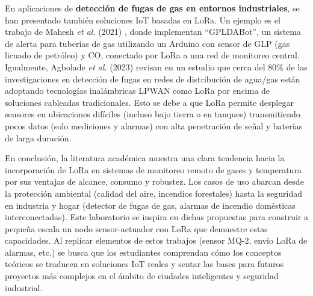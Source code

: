En aplicaciones de \textbf{detección de fugas de gas en entornos industriales}, se han presentado también soluciones IoT basadas en LoRa. Un ejemplo es el trabajo de Mahesh \textit{et al.} (2021) \cite{Mahesh2021}, donde implementan “GPLDABot”, un sistema de alerta para tuberías de gas utilizando un Arduino con sensor de GLP (gas licuado de petróleo) y CO, conectado por LoRa a una red de monitoreo central. Igualmente, Agbolade \textit{et al.} (2023) \cite{Agbolade2023} revisan en un estudio que cerca del 80\% de las investigaciones en detección de fugas en redes de distribución de agua/gas están adoptando tecnologías inalámbricas LPWAN como LoRa por encima de soluciones cableadas tradicionales. Esto se debe a que LoRa permite desplegar sensores en ubicaciones difíciles (incluso bajo tierra o en tanques) transmitiendo pocos datos (solo mediciones y alarmas) con alta penetración de señal y baterías de larga duración.

En conclusión, la literatura académica muestra una clara tendencia hacia la incorporación de LoRa en sistemas de monitoreo remoto de gases y temperatura por sus ventajas de alcance, consumo y robustez. Los casos de uso abarcan desde la protección ambiental (calidad del aire, incendios forestales) hasta la seguridad en industria y hogar (detector de fugas de gas, alarmas de incendio domésticas interconectadas). Este laboratorio se inspira en dichas propuestas para construir a pequeña escala un nodo sensor-actuador con LoRa que demuestre estas capacidades. Al replicar elementos de estos trabajos (sensor MQ-2, envío LoRa de alarmas, etc.) se busca que los estudiantes comprendan cómo los conceptos teóricos se traducen en soluciones IoT reales y sentar las bases para futuros proyectos más complejos en el ámbito de ciudades inteligentes y seguridad industrial.